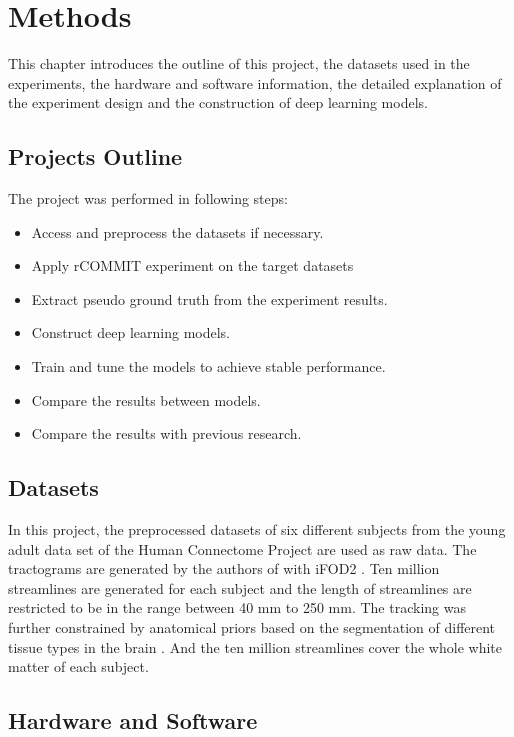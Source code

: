 \chapter{Methods}

This chapter introduces the outline of this project, the datasets used in the experiments, the hardware and software information, the detailed 
explanation of the experiment design and the construction of deep learning models.

\section{Projects Outline}
The project was performed in following steps:
\begin{itemize}
    \item Access and preprocess the datasets if necessary.
    \item Apply rCOMMIT experiment on the target datasets
    \item Extract pseudo ground truth from the experiment results.
    \item Construct deep learning models.
    \item Train and tune the models to achieve stable performance.
    \item Compare the results between models.
    \item Compare the results with previous research.
  \end{itemize}

\section{Datasets}
In this project, the preprocessed datasets of six different subjects from the young adult data set of the Human Connectome Project \cite{vanessenWUMinnHumanConnectome2013} are used as raw data.
The tractograms are generated by the authors of \cite{TractSegFastAccurate} with iFOD2 \cite{tournierImprovedProbabilisticStreamlinesa}. 
Ten million streamlines are generated for each subject and the length of streamlines are restricted to be in the range between 40 mm to 250 mm.
The tracking was further constrained by anatomical priors based on the segmentation of different tissue types in the brain \cite{smithAnatomicallyconstrainedTractographyImproved2012}.
And the ten million streamlines cover the whole white matter of each subject. 

\section{Hardware and Software}

